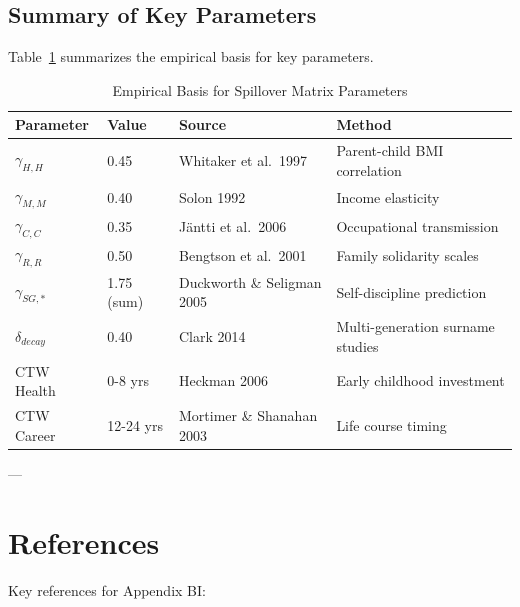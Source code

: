 \subsection{Summary of Key Parameters}

Table~\ref{tab:BI-literature-params} summarizes the empirical basis for key parameters.

\begin{table}[htbp]
\centering
\caption{Empirical Basis for Spillover Matrix Parameters}
\label{tab:BI-literature-params}
\renewcommand{\arraystretch}{1.2}
\small
\begin{tabular}{@{}llll@{}}
\toprule
\textbf{Parameter} & \textbf{Value} & \textbf{Source} & \textbf{Method} \\
\midrule
$\gamma_{H,H}$ & 0.45 & Whitaker et al.~1997 & Parent-child BMI correlation \\
$\gamma_{M,M}$ & 0.40 & Solon 1992 & Income elasticity \\
$\gamma_{C,C}$ & 0.35 & Jäntti et al.~2006 & Occupational transmission \\
$\gamma_{R,R}$ & 0.50 & Bengtson et al.~2001 & Family solidarity scales \\
$\gamma_{SG,*}$ & 1.75 (sum) & Duckworth \& Seligman 2005 & Self-discipline prediction \\
$\delta_{decay}$ & 0.40 & Clark 2014 & Multi-generation surname studies \\
CTW Health & 0-8 yrs & Heckman 2006 & Early childhood investment \\
CTW Career & 12-24 yrs & Mortimer \& Shanahan 2003 & Life course timing \\
\bottomrule
\end{tabular}
\end{table}

---

\section*{References}

\nocite{bcm_master}

Key references for Appendix BI:

